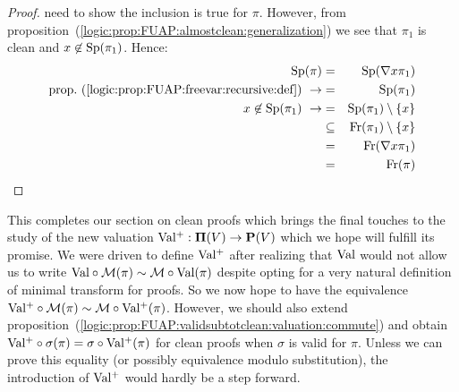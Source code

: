 \begin{proof}
need to show the inclusion is true for $\pi$. However, from
proposition~(\ref{logic:prop:FUAP:almostclean:generalization}) we
see that $\pi_{1}$ is clean and $x\not\in\mbox{\rm Sp}(\pi_{1})$. Hence:
    \begin{eqnarray*}
        \spec(\pi)&=&\spec(\gen x\pi_{1})\\
        \mbox{prop.~(\ref{logic:prop:FUAP:freevar:recursive:def})}\ \rightarrow
        &=&\spec(\pi_{1})\\
        x\not\in\spec(\pi_{1})\ \rightarrow
        &=&\spec(\pi_{1})\setminus\{x\}\\
        &\subseteq&\free(\pi_{1})\setminus\{x\}\\
        &=&\free(\gen x\pi_{1})\\
        &=&\free(\pi)
    \end{eqnarray*}
\end{proof}

This completes our section on clean proofs which brings the final
touches to the study of the new valuation $\mbox{$\rm Val^{+}$}:\mbox{${\bf\Pi}(V)$}\to\mbox{${\bf P}(V)$}$ which
we hope will fulfill its promise. We were driven to define $\mbox{$\rm Val^{+}$}$
after realizing that $\mbox{\rm Val}$ would not allow us to write
$\mbox{\rm Val}\circ{\cal M}(\pi)\sim{\cal M}\circ\mbox{\rm Val}(\pi)$ despite opting
for a very natural definition of minimal transform for proofs. So we
now hope to have the equivalence $\mbox{$\rm Val^{+}$}\circ{\cal M}(\pi)\sim{\cal
M}\circ\mbox{$\rm Val^{+}$}(\pi)$. However, we should also extend
proposition~(\ref{logic:prop:FUAP:validsubtotclean:valuation:commute})
and obtain $\mbox{$\rm Val^{+}$}\circ\sigma(\pi)=\sigma\circ\mbox{$\rm Val^{+}$}(\pi)$ for clean
proofs when $\sigma$ is valid for $\pi$. Unless we can prove this
equality (or possibly equivalence modulo substitution), the
introduction of $\mbox{$\rm Val^{+}$}$ would hardly be a step forward.
